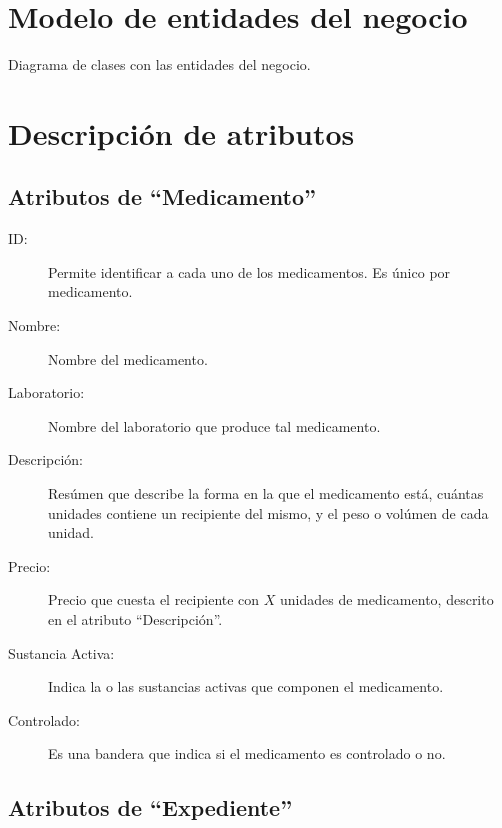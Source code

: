 

\section{Modelo de entidades del negocio}

Diagrama de clases con las entidades del negocio.


\section{Descripción de atributos}

\subsection{Atributos de ``Medicamento''}

\begin{description}
	\item[ID: ] Permite identificar a cada uno de los medicamentos. Es \'unico por medicamento.
	\item[Nombre: ] Nombre del medicamento.
	\item[Laboratorio: ] Nombre del laboratorio que produce tal medicamento.
	\item[Descripci\'on: ] Res\'umen que describe la forma en la que el medicamento est\'a, cu\'antas unidades contiene un recipiente del mismo, y el peso o vol\'umen de cada unidad.
	\item[Precio: ] Precio que cuesta el recipiente con $X$ unidades de medicamento, descrito en el atributo "`Descripci\'on"'.
	\item[Sustancia Activa: ] Indica la o las sustancias activas que componen el medicamento. 
	\item[Controlado: ] Es una bandera que indica si el medicamento es controlado o no.
\end{description}
\subsection{Atributos de ``Expediente''}

